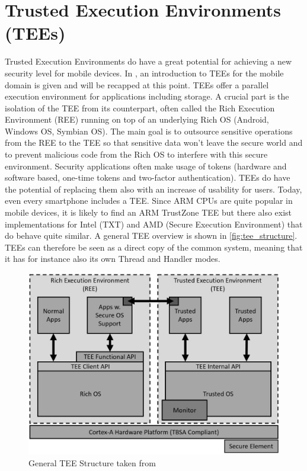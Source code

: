 \chapter{Trusted Execution Environments (TEEs)}\label{chapter:tee}

Trusted Execution Environments do have a great potential for achieving a new
security level for mobile devices. In \parencite{mobile_tee}, an introduction
to TEEs for the mobile domain is given and will be recapped at this point.
TEEs offer a parallel execution environment for applications including storage. A crucial part is the isolation of the TEE from its counterpart, often called the Rich Execution Environment (REE) running on top of an underlying Rich OS (Android, Windows OS, Symbian OS). The main goal is to outsource sensitive operations from the REE to the TEE so that sensitive data won't leave
the secure world and to prevent malicious code from the Rich OS to interfere with this secure environment. Security applications often make usage of tokens (hardware
and software based, one-time tokens and two-factor authentication).
TEEs do have the potential of replacing them also with an increase of usability
for users.
Today, even every smartphone includes a TEE. Since ARM CPUs are quite popular in mobile devices, it is likely to find an ARM TrustZone TEE but there also exist implementations for Intel (TXT) and AMD (Secure Execution Environment) that do behave quite similar.
A general TEE overview is shown in \autoref{fig:tee_structure}. TEEs can therefore be seen as a direct copy of the common
system, meaning that it has for instance also its own Thread and Handler modes.
\begin{figure}[htb]
  \centering
  \includegraphics[scale=0.5]{figures/TEE_structure}
  \caption[General TEE Structure]{General TEE Structure taken from \parencite{tee_dev}}
  \label{fig:tee_structure}
\end{figure}

